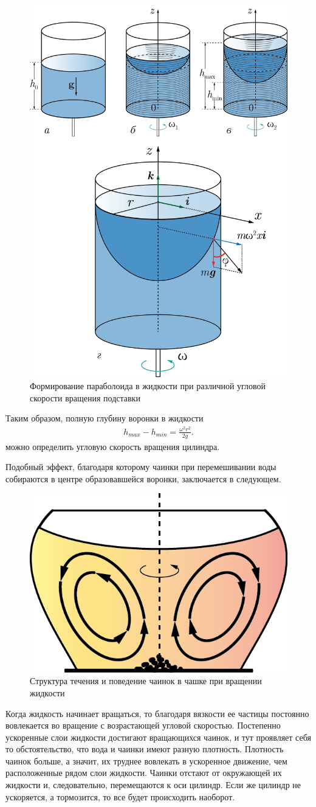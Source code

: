 \documentclass[14pt,a4paper,oneside]{extarticle}	%
\begin{document}
\begin{figure}[H] 
	\centering 	
	\includegraphics[width=0.6\linewidth]{paraboloid-3.png}
	\caption{Формирование параболоида в жидкости при различной угловой скорости вращения подставки}
	\label{paraboloid-3}
\end{figure}

Таким образом, полную глубину воронки в жидкости
\begin{align}\label{2}
h_{max} - h_{min}= \frac{\omega^{2} r^{2}}{2g}.
\end{align}
можно определить угловую скорость вращения цилиндра.

Подобный эффект, благодаря которому чаинки при перемешивании воды собираются в центре образовавшейся воронки, заключается в следующем.

\begin{figure}[H]
	\centering 	
	\includegraphics[width=0.45\linewidth]{paraboloid-4.png}
	\caption{Структура течения и поведение чаинок в чашке при вращении жидкости}
	\label{paraboloid-4}
\end{figure}

Когда жидкость начинает вращаться, то благодаря вязкости ее частицы постоянно вовлекается во вращение с возрастающей угловой скоростью. 
Постепенно ускоренные слои жидкости достигают вращающихся чаинок, и тут проявляет себя то обстоятельство, что вода и чаинки имеют разную плотность.
Плотность чаинок больше, а значит, их труднее вовлекать в ускоренное движение, чем расположенные рядом слои жидкости. 
Чаинки отстают от окружающей их жидкости и, следовательно, перемещаются к оси цилиндр.
Если же цилиндр не ускоряется, а тормозится, то все будет происходить наоборот.
\end{document}
